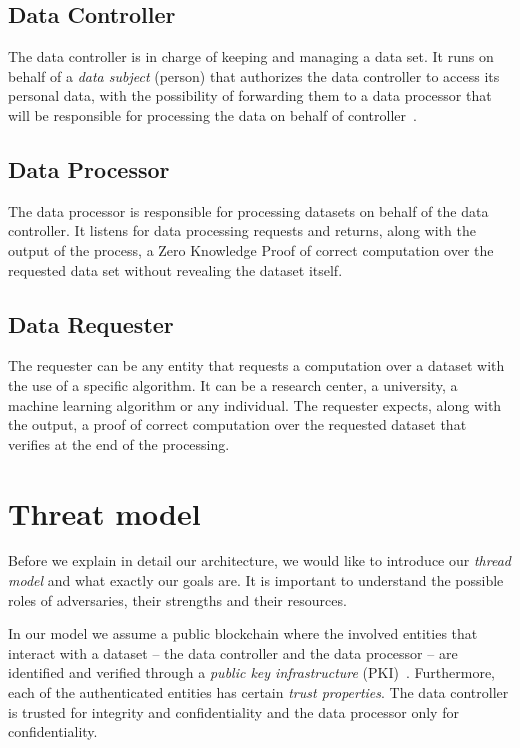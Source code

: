 \subsection{Data Controller}
\label{solution:entities:data_controller}

The data controller is in charge of keeping and managing a data set. It runs on behalf of a \textit{data subject} (person) that authorizes the data controller to access its personal data, with the possibility of forwarding them to a data processor that will be responsible for processing the data on behalf of controller~\cite{DBLP:journals/corr/NeisseSF17}.

\subsection{Data Processor}
\label{solution:entities:data_processor}

The data processor is responsible for processing datasets on behalf of the data controller. It listens for data processing requests and returns, along with the output of the process, a Zero Knowledge Proof of correct computation over the requested data set without revealing the dataset itself.

\subsection{Data Requester}
\label{solution:entities:data_req}

The requester can be any entity that requests a computation over a dataset with the use of a specific algorithm. It can be a research center, a university, a machine learning algorithm or any individual. The requester expects, along with the output, a proof of correct computation over the requested dataset that verifies at the end of the processing.

\section{Threat model}
\label{solution:treat_model}

Before we explain in detail our architecture, we would like to introduce our \textit{thread model} and what exactly our goals are. It is important to understand the possible roles of adversaries, their strengths and their resources.

In our model we assume a public blockchain where the involved entities that interact with a dataset -- the data controller and the data processor -- are identified and verified through a \textit{public key infrastructure} (PKI)~\cite{adams_understanding_2003}. Furthermore, each of the authenticated entities has certain \textit{trust properties}. Τhe data controller is trusted for integrity and confidentiality and the data processor only for confidentiality.

